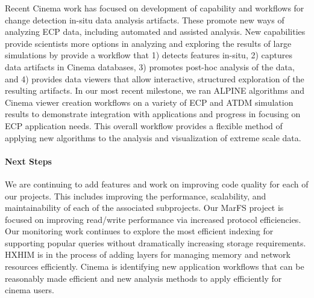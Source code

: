 Recent Cinema work has focused on development of capability
and workflows for change detection in-situ data analysis artifacts. These
promote new ways of analyzing ECP data, including
automated and assisted analysis. New capabilities provide 
scientists more options in analyzing and exploring the results of large
simulations by provide a workflow that 1) detects features in-situ, 2)
captures data artifacts in Cinema databases, 3) promotes
post-hoc analysis of the data, and 4)
provides data viewers that allow interactive, structured exploration of the
resulting artifacts. In our most recent milestone, we ran
ALPINE algorithms and Cinema viewer creation workflows on a variety of
ECP and ATDM simulation results to demonstrate integration with applications
and progress in focusing on ECP application needs.
This overall workflow provides a
flexible method of applying new algorithms to the analysis and visualization
of extreme scale data.

\paragraph{Next Steps}
We are continuing to add features and work on improving code quality for
each of our projects. This includes improving the performance, scalability,
and maintainability of each of the associated subprojects. Our MarFS project is
focused on improving read/write performance via increased protocol
efficiencies. Our monitoring work continues to explore the most efficient
indexing for supporting popular queries without dramatically increasing
storage requirements. HXHIM is in the process of adding layers for managing
memory and network resources efficiently. Cinema is identifying new
application workflows that can be reasonably made efficient and new analysis
methods to apply efficiently for cinema users.

